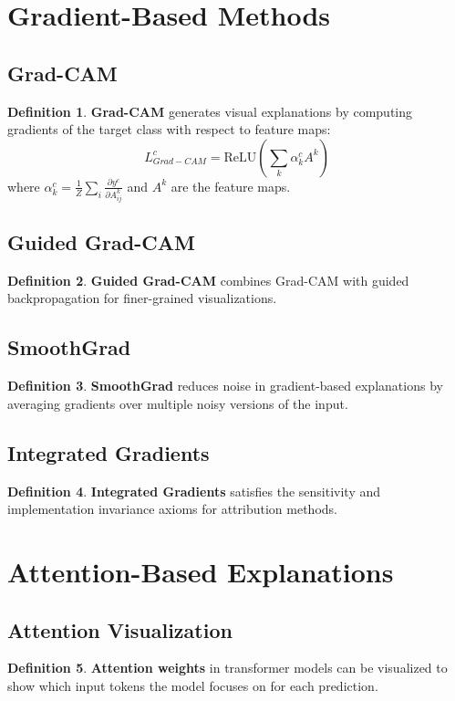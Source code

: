 \documentclass[11pt]{article}
\theoremstyle{definition}
\newtheorem{definition}{Definition}[section]
\begin{document}
\section{Gradient-Based Methods}

\subsection{Grad-CAM}
\begin{definition}
\textbf{Grad-CAM} generates visual explanations by computing gradients of the target class with respect to feature maps:
$$L_{Grad-CAM}^c = \text{ReLU}\left(\sum_k \alpha_k^c A^k\right)$$
where $\alpha_k^c = \frac{1}{Z}\sum_i \frac{\partial y^c}{\partial A_{ij}^k}$ and $A^k$ are the feature maps.
\end{definition}

\subsection{Guided Grad-CAM}
\begin{definition}
\textbf{Guided Grad-CAM} combines Grad-CAM with guided backpropagation for finer-grained visualizations.
\end{definition}

\subsection{SmoothGrad}
\begin{definition}
\textbf{SmoothGrad} reduces noise in gradient-based explanations by averaging gradients over multiple noisy versions of the input.
\end{definition}

\subsection{Integrated Gradients}
\begin{definition}
\textbf{Integrated Gradients} satisfies the sensitivity and implementation invariance axioms for attribution methods.
\end{definition}

\section{Attention-Based Explanations}

\subsection{Attention Visualization}
\begin{definition}
\textbf{Attention weights} in transformer models can be visualized to show which input tokens the model focuses on for each prediction.
\end{definition}
\end{document}
